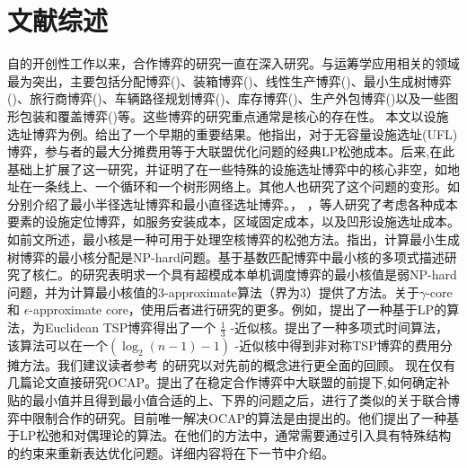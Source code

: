 \documentclass[UTF8]{article}
\begin{document}
\section{文献综述}\label{sec:review}
自\cite{shapley1952value}的开创性工作以来，合作博弈的研究一直在深入研究。与运筹学应用相关的领域最为突出，主要包括分配博弈(\citealt{Shapley1971AssignmentGame,Martinez2013})、装箱博弈(\citealt{Faigle1993,Liu2009})、线性生产博弈(\citealt{Owen1975LinearProductionGames})、最小生成树博弈(\citealt{Granot1981MinimumSpanningTreeGames})、旅行商博弈(\citealt{Tamir1989TSPGames,Potters1992})、车辆路径规划博弈(\citealt{Gothe1996VehicleRoutingGames,Engevall2004})、库存博弈(\citealt{Hartman2000, Chen2009, Chen2009b, He2012,Zhang2009})、生产外包博弈(\citealt{Aydinliyim2010,Cai2012})以及一些图形包装和覆盖博弈(\citealt{Deng1999PackingAndCoveringGames})等。这些博弈的研究重点通常是核心的存在性。
本文以设施选址博弈为例。\cite{Kolen1983FacilityLocationGame}给出了一个早期的重要结果。他指出，对于无容量设施选址(UFL)博弈，参与者的最大分摊费用等于大联盟优化问题的经典LP松弛成本。后来,\cite{Goemans2000FacilityLocationGames}在此基础上扩展了这一研究，并证明了在一些特殊的设施选址博弈中的核心非空，如地址在一条线上、一个循环和一个树形网络上。其他人也研究了这个问题的变形。如\cite{Puerto2011,Puerto2012}分别介绍了最小半径选址博弈和最小直径选址博弈。\cite{Xu2009}， \cite{Mallozzi2011}，\cite{Li2012UFLPConcave}等人研究了考虑各种成本要素的设施定位博弈，如服务安装成本，区域固定成本，以及凹形设施选址成本。
如前文所述，最小核是一种可用于处理空核博弈的松弛方法。\cite{faigle2000note}指出，计算最小生成树博弈的最小核分配是NP-hard问题。\cite{Kern2003}基于基数匹配博弈中最小核的多项式描述研究了核仁。\cite{Uhan2010}的研究表明求一个具有超模成本单机调度博弈的最小核值是弱NP-hard问题，并为计算最小核值的3-approximate算法（界为3）提供了方法\cite{Uhan2013LeastCore}。关于$\gamma$-core 和 $\epsilon$-approximate core，使用后者进行研究的更多。例如，\cite{Faigle1998EuclideanTSPGamesCore}提出了一种基于LP的算法，为Euclidean TSP博弈得出了一个 $\frac{1}{3}$ -近似核。\cite{Blaser2008MetricTSPGamesCore}提出了一种多项式时间算法，该算法可以在一个$(\log_2(n-1)-1)$ -近似核中得到非对称TSP博弈的费用分摊方法。我们建议读者参考 \cite{Jain2007CostSharing}的研究以对先前的概念进行更全面的回顾。
现在仅有几篇论文直接研究OCAP。\cite{Bachrach2009Cost}提出了在稳定合作博弈中大联盟的前提下,如何确定补贴的最小值并且得到最小值合适的上、下界的问题之后，\cite{Meir2011subsidies}进行了类似的关于联合博弈中限制合作的研究。目前唯一解决OCAP的算法是由\cite{Caprara2010LPB}提出的。他们提出了一种基于LP松弛和对偶理论的算法。在他们的方法中，通常需要通过引入具有特殊结构的约束来重新表达优化问题。详细内容将在下一节中介绍。
\end{document}

